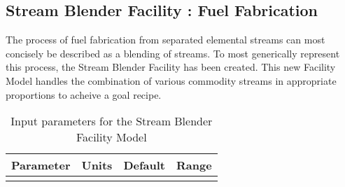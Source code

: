 \subsection{Stream Blender Facility : Fuel Fabrication}

The process of fuel fabrication from separated elemental streams can most
concisely be described as a blending of streams. To most generically represent
this process, the Stream Blender Facility has been created.  This new Facility
Model handles the combination of various commodity streams in appropriate
proportions to acheive a goal recipe.  

\begin{table}[h!]
\centering
\begin{tabular}{|l|r|r|r|}
\hline
\textbf{Parameter} & \textbf{Units} & \textbf{Default} & \textbf{Range}\\
\hline
& & & \\
\hline
\end{tabular}
\caption{Input parameters for the Stream Blender Facility Model}
\label{tab:commodconverter}
\end{table}
